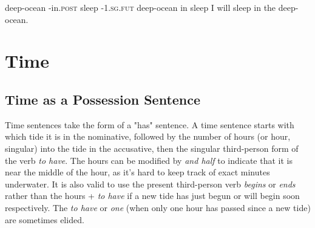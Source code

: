 \documentclass[11pt]{report}
\newcommand{\h}{{$^h$}}
\begin{document}
\trigloss[preamble={\textipa{sAfisi m@mAmiwi}}]
{\textipa{sAfi} -\textipa{si} \textipa{m@mAp\h} -\textipa{iwi}}
{deep-ocean -in.\textsc{post} sleep -\textsc{1.sg.fut}}
{deep-ocean in sleep {}}
{I will sleep in the deep-ocean.}

\section{Time}
\subsection{Time as a Possession Sentence}
\label{sec:time}
Time sentences take the form of a "has" sentence.  A time sentence starts with which tide it is in the nominative, followed by the number of hours (or hour, singular) into the tide in the accusative, then the singular third-person form of the verb \textit{to have}.  The hours can be modified by \textit{and half} to indicate that it is near the middle of the hour, as it's hard to keep track of exact minutes underwater.  It is also valid to use the present third-person verb \textit{begins} or \textit{ends} rather than the hours + \textit{to have} if a new tide has just begun or will begin soon respectively.  The \textit{to have} or \textit{one} (when only one hour has passed since a new tide) are sometimes elided.
\end{document}
